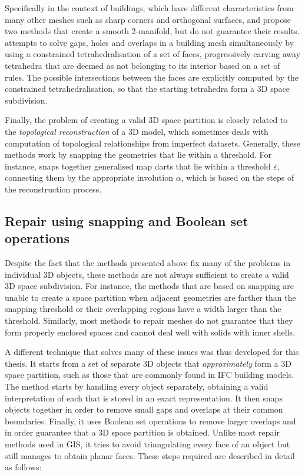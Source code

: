 Specifically in the context of buildings, which have different characteristics from many other meshes such as sharp corners and orthogonal surfaces, \citet{Bogdahn10} and \citet{Alam13} propose two methods that create a smooth 2-manifold, but do not guarantee their results.
\citet{Zhao14} attempts to solve gaps, holes and overlaps in a building mesh simultaneously by using a constrained tetrahedralisation \citep{Si05} of a set of faces, progressively carving away tetrahedra that are deemed as not belonging to its interior based on a set of rules.
The possible intersections between the faces are explicitly computed by the constrained tetrahedralisation, so that the starting tetrahedra form a 3D space subdivision.

Finally, the problem of creating a valid 3D space partition is closely related to the \emph{topological reconstruction} of a 3D model, which sometimes deals with computation of topological relationships from imperfect datasets.
Generally, these methods work by snapping the geometries that lie within a threshold.
For instance, \citet{Horna06} snaps together generalised map darts that lie within a threshold $\varepsilon$, connecting them by the appropriate involution $\alpha$, which is based on the steps of the reconstruction process.

\subsection{Repair using snapping and Boolean set operations}

Despite the fact that the methods presented above fix many of the problems in individual 3D objects, these methods are not always sufficient to create a valid 3D space subdivision.
For instance, the methods that are based on snapping are unable to create a space partition when adjacent geometries are farther than the snapping threshold or their overlapping regions have a width larger than the threshold.
Similarly, most methods to repair meshes do not guarantee that they form properly enclosed spaces and cannot deal well with solids with inner shells.

A different technique that solves many of these issues was thus developed for this thesis.
It starts from a set of separate 3D objects that \emph{approximately} form a 3D space partition, such as those that are commonly found in IFC building models.
The method starts by handling every object separately, obtaining a valid interpretation of each that is stored in an exact representation.
It then snaps objects together in order to remove small gaps and overlaps at their common boundaries.
Finally, it uses Boolean set operations to remove larger overlaps and in order guarantee that a 3D space partition is obtained.
Unlike most repair methods used in GIS, it tries to avoid triangulating every face of an object but still manages to obtain planar faces.
These steps required are described in detail as follows:

